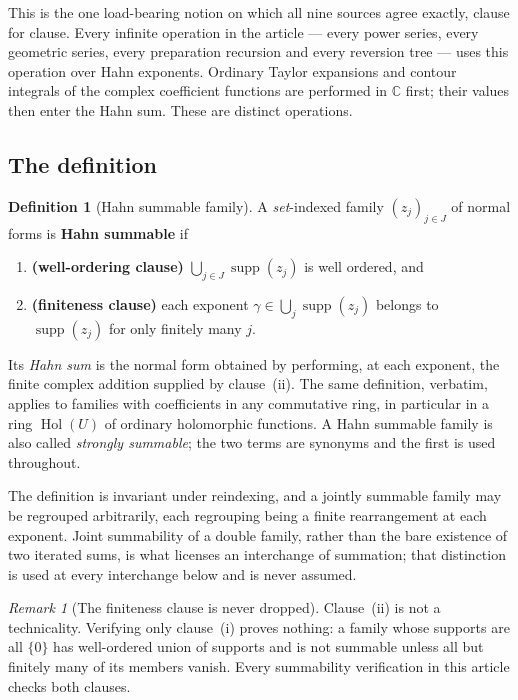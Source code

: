 \documentclass[11pt,a4paper]{article}
\numberwithin{equation}{section}
\theoremstyle{definition}
\newtheorem{definition}[theorem]{Definition}
\theoremstyle{remark}
\newtheorem{remark}[theorem]{Remark}
\theoremstyle{plain}
\newcommand{\CC}{\mathbb C}
\DeclareMathOperator{\Hol}{Hol}
\DeclareMathOperator{\supp}{supp}
\begin{document}
This is the one load-bearing notion on which all nine sources agree
exactly, clause for clause.  Every infinite operation in the article ---
every power series, every geometric series, every preparation
recursion and every reversion tree --- uses this operation over Hahn
exponents. Ordinary Taylor expansions and contour integrals of the
complex coefficient functions are performed in $\CC$ first; their
values then enter the Hahn sum. These are distinct operations.

\subsection{The definition}\label{a:sec:sumdef}

\begin{definition}[Hahn summable family]\label{a:def:summable}
A \emph{set}-indexed family $(z_j)_{j\in J}$ of normal forms is
\textbf{Hahn summable} if
\begin{enumerate}[label=\textup{(\roman*)},leftmargin=2.4em]
\item \textbf{(well-ordering clause)}
$\bigcup_{j\in J}\supp(z_j)$ is well ordered, and
\item \textbf{(finiteness clause)} each exponent
$\gamma\in\bigcup_j\supp(z_j)$ belongs to $\supp(z_j)$ for only finitely
many $j$.
\end{enumerate}
Its \emph{Hahn sum} is the normal form obtained by performing, at each
exponent, the finite complex addition supplied by clause~(ii).
The same definition, verbatim, applies to families with coefficients in
any commutative ring, in particular in a ring $\Hol(U)$ of ordinary
holomorphic functions.  A Hahn summable family is also called
\emph{strongly summable}; the two terms are synonyms and the first is
used throughout.
\end{definition}

The definition is invariant under reindexing, and a jointly summable
family may be regrouped arbitrarily, each regrouping being a finite
rearrangement at each exponent.  Joint summability of a double family,
rather than the bare existence of two iterated sums, is what licenses an
interchange of summation; that distinction is used at every interchange
below and is never assumed.

\begin{remark}[The finiteness clause is never dropped]\label{a:rule:clauseii}
Clause~(ii) is not a technicality.  Verifying only clause~(i) proves
nothing: a family whose supports are all $\{0\}$ has well-ordered union
of supports and is not summable unless all but finitely many of its
members vanish.  Every summability verification in this article checks
both clauses.
\end{remark}
\end{document}
